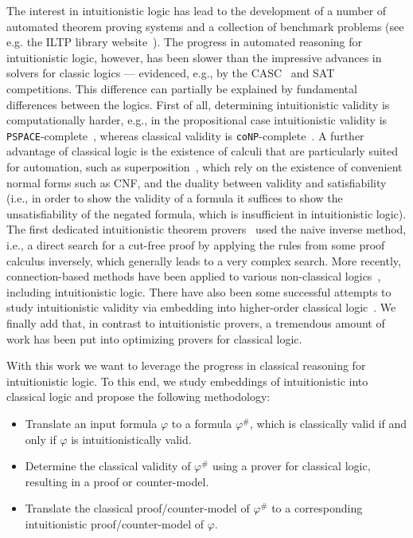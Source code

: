 \documentclass[runningheads]{llncs}
\begin{document}
The interest in intuitionistic logic has lead to the development of a number of automated theorem proving systems and a collection of benchmark problems (see e.g. the ILTP library website~\cite{iltp}).
The progress in automated reasoning for intuitionistic logic, however, has been slower than the  impressive advances in solvers for classic logics --- evidenced, e.g., by the CASC~\cite{casc} and SAT~\cite{satc} competitions.
This difference can partially be explained by fundamental differences between the logics.
First of all, determining intuitionistic validity is computationally harder, e.g., in the propositional case intuitionistic validity is \verb+PSPACE+-complete~\cite{statman1979intuitionistic}, whereas classical validity is \verb+coNP+-complete~\cite{cook1971complexity}.
A further advantage of classical logic is the existence of calculi that are particularly suited for automation, such as superposition~\cite{bachmair2001resolution}, which rely on the existence of convenient normal forms such as CNF, and the duality between validity and satisfiability (i.e., in order to show the validity of a formula it suffices to show the unsatisfiability of the negated formula, which is insufficient in intuitionistic logic).
The first dedicated intuitionistic theorem provers~\cite{mclaughlin2009efficient,tammet1996resolution} used the naive inverse method, i.e., a direct search for a cut-free proof by applying the rules from some proof calculus inversely, which generally leads to a very complex search. 
More recently, connection-based methods have been applied to various non-classical logics~\cite{otten2005clausal,otten2021nanocop}, including intuitionistic logic.
There have also been some successful attempts to study intuitionistic validity via embedding into higher-order classical logic~\cite{LEO}.
We finally add that, in contrast to intuitionistic provers, a tremendous amount of work has been put into optimizing provers for classical logic.

With this work we want to leverage the progress in classical reasoning for intuitionistic logic.
To this end, we study embeddings of intuitionistic into classical logic and propose the following methodology:
\begin{itemize}
	\item Translate an input formula $\varphi$ to a formula $\varphi^\#$, which is classically valid if and only if $\varphi$ is intuitionistically valid.
	\item Determine the classical validity of $\varphi^\#$ using a prover for classical logic, resulting in a proof or counter-model.
	\item Translate the classical proof/counter-model of $\varphi^\#$ to a corresponding intuitionistic proof/counter-model of $\varphi$.
\end{itemize}
\end{document}
